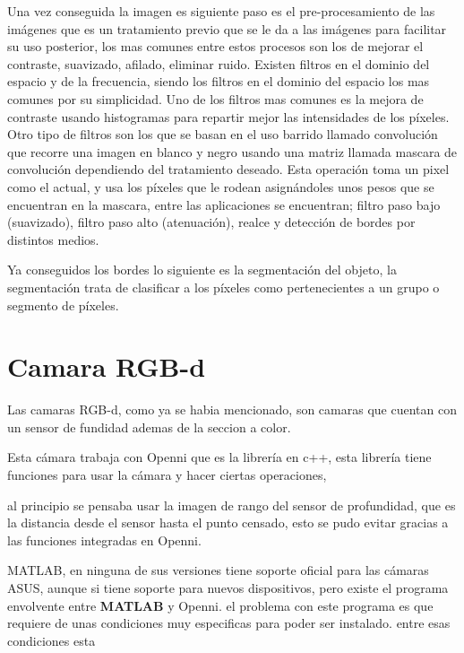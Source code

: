     Una vez conseguida la imagen es siguiente paso es el pre-procesamiento de las imágenes que es un tratamiento previo que se le da a las imágenes para facilitar su uso posterior, los mas comunes entre estos procesos son los de mejorar el contraste, suavizado, afilado, eliminar ruido. Existen filtros en el dominio del espacio y de la frecuencia, siendo los filtros en el dominio del espacio los mas comunes por su simplicidad. Uno de los filtros mas comunes es la mejora de contraste usando histogramas para repartir mejor las intensidades de los píxeles. Otro tipo de filtros son los que se basan en el uso barrido llamado convolución que recorre una imagen en blanco y negro usando una matriz llamada mascara de convolución dependiendo del tratamiento deseado. Esta operación toma un pixel como el actual, y usa los píxeles que le rodean asignándoles unos pesos que se encuentran en la mascara, entre las aplicaciones se encuentran; filtro paso bajo (suavizado), filtro paso alto (atenuación), realce y detección de bordes por distintos medios.
    
    Ya conseguidos los bordes lo siguiente es la segmentación del objeto, la segmentación trata de clasificar a los píxeles como pertenecientes a un grupo o segmento de píxeles.
    
    \section{Camara RGB-d}
    
    Las camaras RGB-d, como ya se habia mencionado, son camaras que cuentan con un sensor de fundidad ademas de la seccion a color.
    
    
    Esta cámara trabaja con Openni que es la librería en c++, esta librería tiene funciones para usar la cámara y hacer ciertas operaciones, 
    
    al principio se pensaba usar la imagen de rango del sensor de profundidad, que es la distancia desde el sensor hasta el punto censado, esto se pudo evitar gracias a las funciones integradas en Openni.
    
    MATLAB, en ninguna de sus versiones tiene soporte oficial para las cámaras ASUS, aunque si tiene soporte para nuevos dispositivos, pero existe el programa envolvente entre \textbf{MATLAB} y Openni.
    el problema con este programa es que requiere de unas condiciones muy especificas para poder ser instalado. entre esas condiciones esta
    
